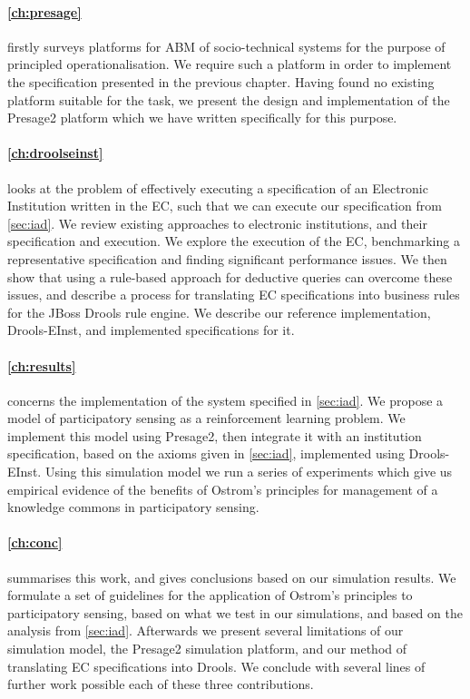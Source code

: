 \paragraph{\autoref{ch:presage}} firstly surveys platforms for \ac{ABM} of
socio-technical systems for the purpose of principled operationalisation. We
require such a platform in order to implement the specification presented in
the previous chapter. Having found no existing platform suitable for the task,
we present the design and implementation of the Presage2 platform which we
have written specifically for this purpose.

\paragraph{\autoref{ch:droolseinst}} looks at the problem of effectively
executing a specification of an Electronic Institution written in the \ac{EC},
such that we can execute our specification from \autoref{sec:iad}. We review
existing approaches to electronic institutions, and their specification and
execution. We explore the execution of the \ac{EC}, benchmarking a
representative specification and finding significant performance issues. We
then show that using a rule-based approach for deductive queries can overcome
these issues, and describe a process for translating \ac{EC} specifications into
business rules for the JBoss Drools rule engine. We describe our reference
implementation, Drools-EInst, and implemented specifications for it.

\paragraph{\autoref{ch:results}} concerns the implementation of the system
specified in \autoref{sec:iad}. We propose a model of participatory sensing as
a reinforcement learning problem. We implement this model using Presage2, then
integrate it with an institution specification, based on the axioms given in
\autoref{sec:iad}, implemented using Drools-EInst. Using this simulation model
we run a series of experiments which give us empirical evidence of the
benefits of Ostrom's principles for management of a knowledge commons in
participatory sensing.

\paragraph{\autoref{ch:conc}} summarises this work, and gives conclusions
based on our simulation results. We formulate a set of guidelines for the
application of Ostrom's principles to participatory sensing, based on what we
test in our simulations, and based on the analysis from \autoref{sec:iad}.
Afterwards we present several limitations of our simulation model, the
Presage2 simulation platform, and our method of translating \ac{EC}
specifications into Drools. We conclude with several lines of further work
possible each of these three contributions.


